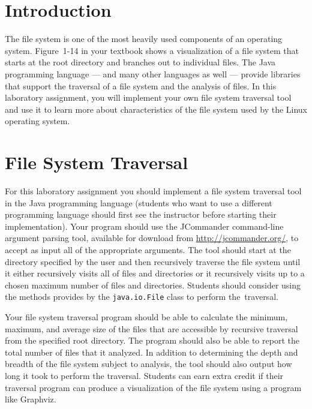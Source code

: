 

\usepackage[compact]{titlesec}



\section*{Introduction}
  
The file system is one of the most heavily used components of an operating system.  Figure~1-14 in your textbook shows a
visualization of a file system that starts at the root directory and branches out to individual files.  The Java programming
language --- and many other languages as well --- provide libraries that support the traversal of a file system and the analysis
of files. In this laboratory assignment, you will implement your own file system traversal tool and use it to learn more about
characteristics of the file system used by the Linux operating system.

\section*{File System Traversal}

For this laboratory assignment you should implement a file system traversal tool in the Java programming language (students who
want to use a different programming language should first see the instructor before starting their implementation). Your program
should use the JCommander command-line argument parsing tool, available for download from \url{http://jcommander.org/}, to accept
as input all of the appropriate arguments. The tool should start at the directory specified by the user and then recursively
traverse the file system until it either recursively visits all of files and directories or it recursively visits up to a
chosen maximum number of files and directories. Students should consider using the methods provides by the {\tt java.io.File}
class to perform \mbox{the traversal}.

Your file system traversal program should be able to calculate the minimum, maximum, and average size of the files that are
accessible by recursive traversal from the specified root directory. The program should also be able to report the total number of
files that it analyzed.  In addition to determining the depth and breadth of the file system subject to analysis, the tool should
also output how long it took to perform the traversal. Students can earn extra credit if their traversal program can produce a
visualization of the file system using a program like Graphviz.

